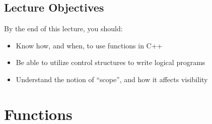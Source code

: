 \documentclass{article}
\title{}
\author{Ryan Baker}
\date{\today}
\begin{document}
\maketitle
\tableofcontents
\pagebreak

\subsection*{Lecture Objectives}

\noindent
By the end of this lecture, you should:
\begin{itemize}
    \item Know how, and when, to use functions in C++
    \item Be able to utilize control structures to write logical programs
    \item Understand the notion of ``scope'', and how it affects visibility
\end{itemize}

\section{Functions}
\end{document}
